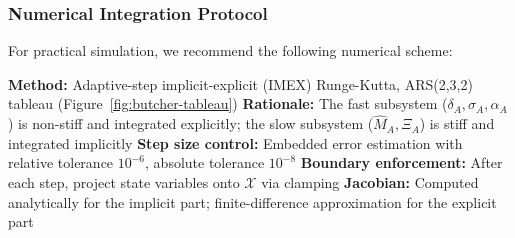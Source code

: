 \subsubsection{Numerical Integration Protocol}\label{sec:numerical-protocol}

For practical simulation, we recommend the following numerical scheme:

\begin{algorithm}[H]
\caption{Σ-Model ODE Integration}\label{alg:ode-integration}
\begin{algorithmic}
\State \textbf{Method:} Adaptive-step implicit-explicit (IMEX) Runge-Kutta, ARS(2,3,2) tableau (Figure~\ref{fig:butcher-tableau})
\State \textbf{Rationale:} The fast subsystem ($\delta_A, \sigma_A, \alpha_A$) is non-stiff and integrated explicitly; the slow subsystem ($\hat{M}_A, \Xi_A$) is stiff and integrated implicitly
\State \textbf{Step size control:} Embedded error estimation with relative tolerance $10^{-6}$, absolute tolerance $10^{-8}$
\State \textbf{Boundary enforcement:} After each step, project state variables onto $\mathcal{X}$ via clamping
\State \textbf{Jacobian:} Computed analytically for the implicit part; finite-difference approximation for the explicit part
\end{algorithmic}
\end{algorithm}

